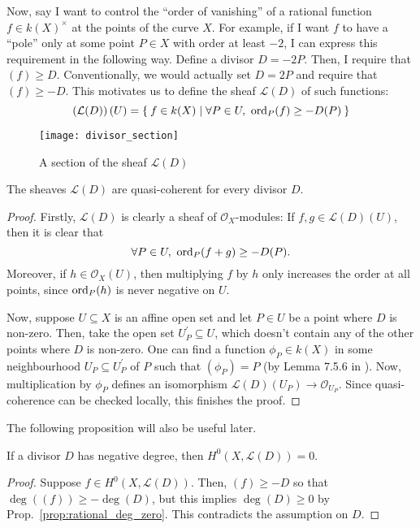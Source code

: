 Now, say I want to control the ``order of vanishing'' of a rational function
$f\in k(X)^{\times}$ at the points of the curve $X$. For example, if I want
$f$ to have a ``pole'' only at some point $P\in X$ with order at least $-2$,
I can express this requirement in the following way. Define a divisor
$D=-2P$. Then, I require that $(f)\geq D$. Conventionally, we would actually
set $D=2P$ and require that $(f)\geq -D$. This motivates us to define the
sheaf $\mathcal{L}(D)$ of such functions:
\[
  \left(\mathcal{L}(D)\right)(U)=\Set{f\in k(X)\mid
  \forall P\in U,\ \operatorname{ord}_{P}(f)\geq -D(P)}
\]
\begin{figure}[H]
  \centering
  \texttt{[image: divisor\_section]}
  \caption{A section of the sheaf $\mathcal{L}(D)$}
\end{figure}
\begin{prop}
  The sheaves $\mathcal{L}(D)$ are quasi-coherent for every divisor $D$.
\end{prop}
\begin{proof}
  Firstly, $\mathcal{L}(D)$ is clearly a sheaf of $\mathscr{O}_{X}$-modules:
  If $f, g\in\mathcal{L}(D)(U)$, then it is clear that
  \[
    \forall P\in U,\ \ord_{P}(f+g)\geq -D(P).
  \]
  Moreover, if $h\in\mathscr{O}_{X}(U)$, then multiplying $f$ by $h$ only
  increases the order at all points, since $\operatorname{ord}_{P}(h)$ is never negative
  on $U$.

  Now, suppose $U\subseteq X$ is an affine open set and let $P\in U$ be a
  point where $D$ is non-zero. Then, take the open set
  $U_{P}^{\prime}\subseteq U$, which doesn't contain any of the other points
  where $D$ is non-zero. One can find a function $\phi_{P}\in k(X)$ in some
  neighbourhood $U_{P}\subseteq U_{P}^{\prime}$ of $P$ such that $(\phi_{P})=P$
  (by Lemma 7.5.6 in \cite{gathmann}). Now, multiplication by $\phi_{P}$
  defines an isomorphism $\mathcal{L}(D)(U_{P})\to \mathscr{O}_{U_{P}}$.
  Since quasi-coherence can be checked locally, this finishes the proof.
\end{proof}
The following proposition will also be useful later.
\begin{prop}\label{prop:global_sec_negative_divisor}
  If a divisor $D$ has negative degree, then $H^{0}(X,\mathcal{L}(D))=0$.
\end{prop}
\begin{proof}
  Suppose $f\in H^{0}(X,\mathcal{L}(D))$. Then, $(f)\geq -D$
  so that $\deg((f))\geq -\deg(D)$, but this implies $\deg(D)\geq 0$
  by Prop.~\ref{prop:rational_deg_zero}. This contradicts the assumption on
  $D$.
\end{proof}

